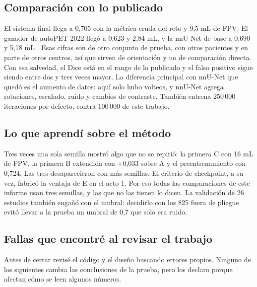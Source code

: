 \subsection{Comparación con lo publicado}

El sistema final llega a \dmas{} 0,705 con la métrica cruda del reto y 9,5 mL de FPV. El ganador de autoPET 2022 llegó a 0,623 y 2,84 mL, y la nnU-Net de base a 0,690 y 5,78 mL \citep{gatidis2024challenge,alloula2023}. Esas cifras son de otro conjunto de prueba, con otros pacientes y en parte de otros centros, así que sirven de orientación y no de comparación directa. Con esa salvedad, el Dice está en el rango de lo publicado y el falso positivo sigue siendo entre dos y tres veces mayor. La diferencia principal con nnU-Net que quedó es el aumento de datos: aquí solo hubo volteos, y nnU-Net agrega rotaciones, escalado, ruido y cambios de contraste. También entrena 250\,000 iteraciones por defecto, contra 100\,000 de este trabajo.

\subsection{Lo que aprendí sobre el método}

Tres veces una sola semilla mostró algo que no se repitió: la primera C con 16 mL de FPV, la primera B extendida con +0,033 sobre A y el preentrenamiento con 0,724. Las tres desaparecieron con más semillas. El criterio de checkpoint, a su vez, fabricó la ventaja de E en el acto 1. Por eso todas las comparaciones de este informe usan tres semillas, y las que no las tienen lo dicen. La validación de 26 estudios también engañó con el umbral: decidirlo con los 825 fuera de pliegue evitó llevar a la prueba un umbral de 0,7 que solo era ruido.

\subsection{Fallas que encontré al revisar el trabajo}
\label{sec:fallas}

Antes de cerrar revisé el código y el diseño buscando errores propios. Ninguno de los siguientes cambia las conclusiones de la prueba, pero los declaro porque afectan cómo se leen algunos números.

